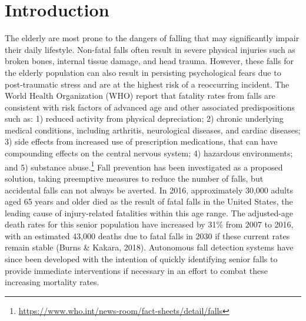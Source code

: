 \documentclass{llncs}
\begin{document}
\section{Introduction}

The elderly are most prone to the dangers of falling that may significantly impair their daily lifestyle. Non-fatal falls often result in severe physical injuries such as broken bones, internal tissue damage, and head trauma. However, these falls for the elderly population can also result in persisting psychological fears due to post-traumatic stress and are at the highest risk of a reoccurring incident. The World Health Organization (WHO) report that fatality rates from falls are consistent with risk factors of advanced age and other associated predispositions such as: 1) reduced activity from physical depreciation; 2) chronic underlying medical conditions, including arthritis, neurological diseases, and cardiac diseases; 3) side effects from increased use of prescription medications, that can have compounding effects on the central nervous system;  4) hazardous environments; and 5) substance abuse.\footnote{\url{https://www.who.int/news-room/fact-sheets/detail/falls}} Fall prevention has been investigated as a proposed solution, taking preemptive measures to reduce the number of falls, but accidental falls can not always be averted.  In 2016, approximately 30,000 adults aged 65 years and older died as the result of fatal falls in the United States, the leading cause of injury-related fatalities within this age range.\cite{burns2018deaths} The adjusted-age death rates for this senior population have increased by 31\% from 2007 to 2016, with an estimated 43,000 deaths due to fatal falls in 2030 if these current rates remain stable (Burns \& Kakara, 2018).\cite{burns2018deaths} Autonomous fall detection systems have since been developed with the intention of quickly identifying senior falls to provide immediate interventions if necessary in an effort to combat these increasing mortality rates.
\end{document}
